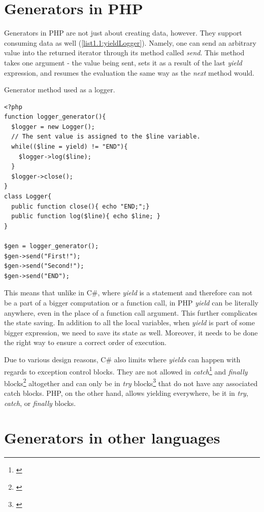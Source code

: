 \section{Generators in PHP}\label{PHPGen}

Generators in PHP are not just about creating data, however. They support consuming data as well (\autoref{list1.1:yieldLogger}). Namely, one can send an arbitrary value into the returned iterator through its method called \emph{send}. This method takes one argument - the value being sent, sets it as a result of the last \emph{yield} expression, and resumes the evaluation the same way as the \emph{next} method would.

\begin{listing}[H]
	\caption{Generator method used as a logger.}
	\label{list1.1:yieldLogger}
\begin{verbatim}
<?php
function logger_generator(){
  $logger = new Logger();
  // The sent value is assigned to the $line variable.
  while(($line = yield) != "END"){
    $logger->log($line);
  }
  $logger->close();
}
class Logger{
  public function close(){ echo "END;";}
  public function log($line){ echo $line; }
}

$gen = logger_generator();
$gen->send("First!");
$gen->send("Second!");
$gen->send("END");
\end{verbatim}
\end{listing}

This means that unlike in C\#, where \emph{yield} is a statement and therefore can not be a part of a bigger computation or a function call, in PHP \emph{yield} can be literally anywhere, even in the place of a function call argument. This further complicates the state saving. In addition to all the local variables, when \emph{yield} is part of some bigger expression, we need to save its state as well. Moreover, it needs to be done the right way to ensure a correct order of execution.

Due to various design reasons, \citep{CSharpYieldFinaly} C\# also limits where \emph{yields} can happen with regards to exception control blocks. They are not allowed in \emph{catch}\footnote{\citep{CSharpYieldCatch}} and \emph{finally} blocks\footnote{\citep{CSharpYieldFinaly}} altogether and can only be in \emph{try} blocks\footnote{\citep{CSharpYieldTry}} that do not have any associated catch blocks. PHP, on the other hand, allows yielding everywhere, be it in \emph{try}, \emph{catch}, or \emph{finally} blocks.

\section{Generators in other languages}

